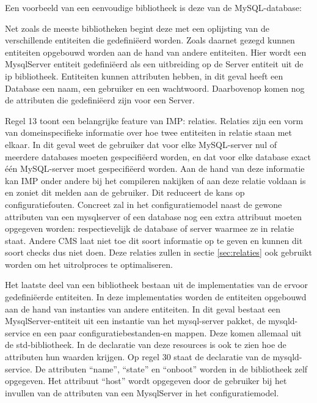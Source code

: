 Een voorbeeld van een eenvoudige bibliotheek is deze van de MySQL-database:



Net zoals de meeste bibliotheken begint deze met een oplijsting van de verschillende entiteiten die gedefini\"eerd worden.
Zoals daarnet gezegd kunnen entiteiten opgebouwd worden aan de hand van andere entiteiten. 
Hier wordt een MysqlServer entiteit gedefini\"eerd als een uitbreiding op de Server entiteit uit de ip bibliotheek.
Entiteiten kunnen attributen hebben, in dit geval heeft een Database een naam, een gebruiker en een wachtwoord.
Daarbovenop komen nog de attributen die gedefini\"eerd zijn voor een Server.

Regel 13 toont een belangrijke feature van IMP: relaties.
Relaties zijn een vorm van domeinspecifieke informatie over hoe twee entiteiten in relatie staan met elkaar. 
In dit geval weet de gebruiker dat voor elke MySQL-server nul of meerdere databases moeten gespecifi\"eerd worden, en dat voor elke database exact \'e\'en MySQL-server moet gespecifi\"eerd worden.
Aan de hand van deze informatie kan IMP onder andere bij het compileren nakijken of aan deze relatie voldaan is en zoniet dit melden aan de gebruiker.
Dit reduceert de kans op configuratiefouten. 
Concreet zal in het configuratiemodel naast de gewone attributen van een mysqlserver of een database nog een extra attribuut moeten opgegeven worden: respectievelijk de database of server waarmee ze in relatie staat.
Andere CMS laat niet toe dit soort informatie op te geven en kunnen dit soort checks dus niet doen.
Deze relaties zullen in sectie \ref{sec:relaties} ook gebruikt worden om het uitrolproces te optimaliseren.

Het laatste deel van een bibliotheek bestaan uit de implementaties van de ervoor gedefini\"eerde entiteiten.
In deze implementaties worden de entiteiten opgebouwd aan de hand van instanties van andere entiteiten.
In dit geval bestaat een MysqlServer-entiteit uit een instantie van het mysql-server pakket, de mysqld-service en een paar configuratiebestanden-en mappen.
Deze komen allemaal uit de std-bibliotheek.
In de declaratie van deze resources is ook te zien hoe de attributen hun waarden krijgen. 
Op regel 30 staat de declaratie van de mysqld-service.
De attributen ``name'', ``state'' en ``onboot'' worden in de bibliotheek zelf opgegeven.
Het attribuut ``host'' wordt opgegeven door de gebruiker bij het invullen van de attributen van een MysqlServer in het configuratiemodel.

